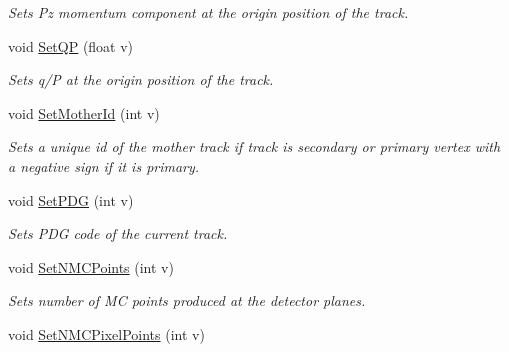 \begin{DoxyCompactItemize}
\begin{DoxyCompactList}\small\item\em Sets Pz momentum component at the origin position of the track. \end{DoxyCompactList}\item 
void \hyperlink{classKFMCTrack_a20cb8b3106cd0e56f279be9c67dccd1d}{Set\+QP} (float v)\hypertarget{classKFMCTrack_a20cb8b3106cd0e56f279be9c67dccd1d}{}\label{classKFMCTrack_a20cb8b3106cd0e56f279be9c67dccd1d}

\begin{DoxyCompactList}\small\item\em Sets q/P at the origin position of the track. \end{DoxyCompactList}\item 
void \hyperlink{classKFMCTrack_a7d13f8bcf32f217ef7cea49930827085}{Set\+Mother\+Id} (int v)\hypertarget{classKFMCTrack_a7d13f8bcf32f217ef7cea49930827085}{}\label{classKFMCTrack_a7d13f8bcf32f217ef7cea49930827085}

\begin{DoxyCompactList}\small\item\em Sets a unique id of the mother track if track is secondary or primary vertex with a negative sign if it is primary. \end{DoxyCompactList}\item 
void \hyperlink{classKFMCTrack_acfb63d1ba31c5ebf903095870041d306}{Set\+P\+DG} (int v)\hypertarget{classKFMCTrack_acfb63d1ba31c5ebf903095870041d306}{}\label{classKFMCTrack_acfb63d1ba31c5ebf903095870041d306}

\begin{DoxyCompactList}\small\item\em Sets P\+DG code of the current track. \end{DoxyCompactList}\item 
void \hyperlink{classKFMCTrack_a0a3e04f8e0564059d1c8f74ccffb6751}{Set\+N\+M\+C\+Points} (int v)\hypertarget{classKFMCTrack_a0a3e04f8e0564059d1c8f74ccffb6751}{}\label{classKFMCTrack_a0a3e04f8e0564059d1c8f74ccffb6751}

\begin{DoxyCompactList}\small\item\em Sets number of MC points produced at the detector planes. \end{DoxyCompactList}\item 
void \hyperlink{classKFMCTrack_a9ee38a914b6c713dc92b37e21f7512db}{Set\+N\+M\+C\+Pixel\+Points} (int v)\hypertarget{classKFMCTrack_a9ee38a914b6c713dc92b37e21f7512db}{}\label{classKFMCTrack_a9ee38a914b6c713dc92b37e21f7512db}


\end{DoxyCompactItemize}
